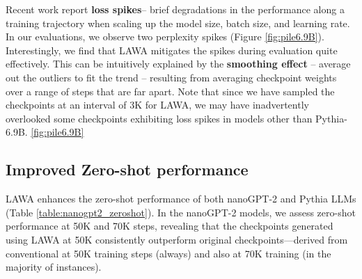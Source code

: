 \documentclass{article}
\newcommand{\method}{LAWA}
\begin{document}

Recent work \citep{kaplan2020scaling,zhang2022opt,touvron2023llama,dey2023cerebrasgpt,wortsman2023stable} report \textbf{loss spikes}-- brief degradations in the performance along a training trajectory when scaling up the model size, batch size, and learning rate. In our evaluations, we observe two perplexity spikes (Figure \ref{fig:pile6.9B}). Interestingly, we find that \method{} mitigates the spikes during evaluation quite effectively. This can be intuitively explained by the \textbf{smoothing effect} -- average out the outliers to fit the trend -- resulting from averaging checkpoint weights over a range of steps that are far apart. Note that since we have sampled the checkpoints at an interval of 3K for \method{}, we may have inadvertently overlooked some checkpoints exhibiting loss spikes in models other than Pythia-6.9B. \ref{fig:pile6.9B}

\subsection{Improved Zero-shot performance}

\method{} enhances the zero-shot performance of both nanoGPT-2 and Pythia LLMs (Table \ref{table:nanogpt2_zeroshot}). In the nanoGPT-2 models, we assess zero-shot performance at 50K and 70K steps, revealing that the checkpoints generated using \method{} at 50K consistently outperform original checkpoints—derived from conventional at 50K training steps (always) and also at 70K training (in the majority of instances).
\end{document}
